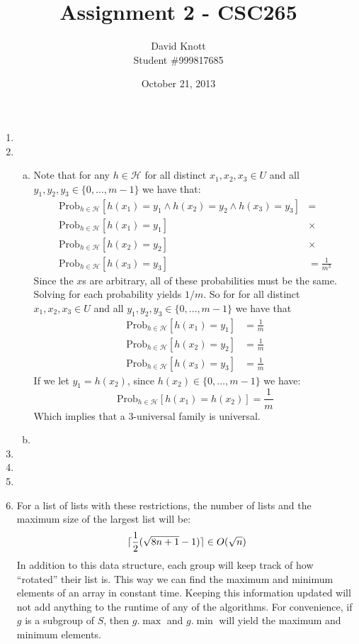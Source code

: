 \documentclass[letterpaper,10pt]{article}
\DeclarePairedDelimiter{\ceil}{\lceil}{\rceil}
\begin{document}
\title{Assignment 2 - CSC265}
\author{David Knott \\  Student \#999817685}
\date{October 21, 2013}
\maketitle
\begin{enumerate}
	\item 

	\clearpage
	\item 
	\begin{enumerate}[a)]
		\item Note that for any $h \in \mathcal{H}$ for all distinct $x_1,x_2,x_3 \in U$ and all $y_1,y_2,y_3 \in \{0,\dots,m-1\}$ we have that:
		\begin{align*}
		\text{Prob}_{h\in\mathcal{H}}[ h(x_1) = y_1 \wedge h(x_2) = y_2 \wedge h(x_3) = y_3 ] & = \\
		\text{Prob}_{h\in\mathcal{H}}[h(x_1) = y_1] & \times \\
		\text{Prob}_{h\in\mathcal{H}}[h(x_2) = y_2] & \times \\
		\text{Prob}_{h\in\mathcal{H}}[h(x_3) = y_3] & = \frac{1}{m^3}
		\end{align*}
		Since the $x$s are arbitrary, all of these probabilities must be the same. Solving for each probability yields $1/m$. So for for all distinct $x_1,x_2,x_3 \in U$ and all $y_1,y_2,y_3 \in \{0,\dots,m-1\}$ we have that 
		\begin{align*}
		\text{Prob}_{h\in\mathcal{H}}[h(x_1) = y_1] & = \frac{1}{m} \\
		\text{Prob}_{h\in\mathcal{H}}[h(x_2) = y_2] & = \frac{1}{m} \\
		\text{Prob}_{h\in\mathcal{H}}[h(x_3) = y_3] & = \frac{1}{m}
		\end{align*}
		If we let $y_1 = h(x_2)$, since $h(x_2) \in \{0,\dots,m-1 \}$ we have:
		$$ \text{Prob}_{h\in\mathcal{H}}[h(x_1) = h(x_2)] = \frac{1}{m} $$
		Which implies that a 3-universal family is universal.
		\item 
	\end{enumerate}
	\clearpage

	\item
	\clearpage

	\item
	\clearpage

	\item
	\clearpage
	\item 
		For a list of lists with these restrictions, the number of lists and the maximum size of the largest list will be:
		$$ \ceil{ \frac{1}{2} (\sqrt{8n + 1} - 1)} \in O(\sqrt{n}) $$
		In addition to this data structure, each group will keep track of how ``rotated'' their list is. This way we can find the maximum and minimum elements of an array in constant time. Keeping this information updated will not add anything to the runtime of any of the algorithms. For convenience, if $g$ is a subgroup of $S$, then $g.\max$ and $g.\min$ will yield the maximum and minimum elements.


\end{enumerate}
\end{document}
